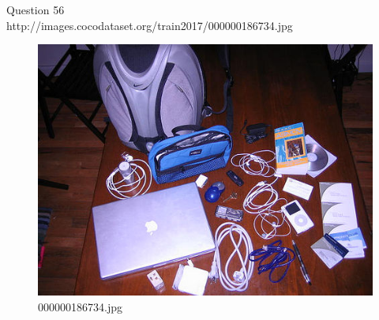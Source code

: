 Question 56\\
http://images.cocodataset.org/train2017/000000186734.jpg
\begin{figure}[h]
    \centering
    \includegraphics[width=0.8\linewidth]{../image set/hard/000000186734.jpg}
    \caption{000000186734.jpg}
\end{figure}
